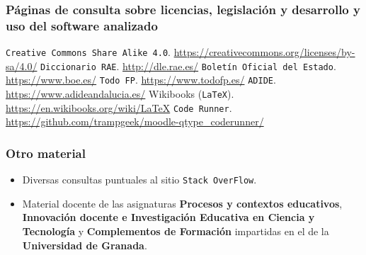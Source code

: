 

\printbibliography[heading=bibempty]

\bigskip
\subsubsection*{Páginas de consulta sobre licencias, legislación y desarrollo y uso del software analizado}
 {\tt Creative Commons Share Alike 4.0}. \url{https://creativecommons.org/licenses/by-sa/4.0/}
 {\tt Diccionario RAE}. \url{http://dle.rae.es/}
 {\tt Boletín Oficial del Estado}. \url{https://www.boe.es/}
 {\tt Todo FP}. \url{https://www.todofp.es/}
 {\tt ADIDE}. \url{https://www.adideandalucia.es/}
 Wikibooks ({\tt LaTeX}). \url{https://en.wikibooks.org/wiki/LaTeX}
 {\tt Code Runner}. \url{https://github.com/trampgeek/moodle-qtype_coderunner/}


\bigskip
\subsubsection*{Otro material}
\begin{itemize}
	\item Diversas consultas puntuales al sitio {\tt Stack OverFlow}.
	\item Material docente de las asignaturas \textbf{Procesos y contextos educativos}, \textbf{Innovación docente e Investigación Educativa en Ciencia y Tecnología} y \textbf{Complementos de Formación} impartidas en el \master de la \textbf{Universidad de Granada}.
\end{itemize}